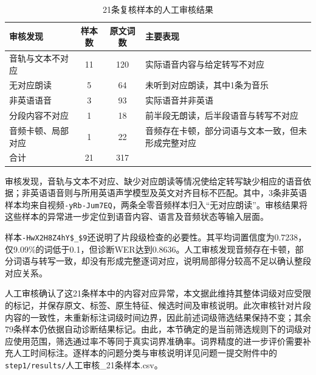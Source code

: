 \begin{table}[H]
    \centering\small
    \caption{21条复核样本的人工审核结果}
    \label{tab:p1_manual_review}
    \setlength{\tabcolsep}{6pt}
    \renewcommand{\arraystretch}{1.12}
    \ifdefined\pOneCompactTableBox\else\newsavebox{\pOneCompactTableBox}\fi
    \begin{lrbox}{\pOneCompactTableBox}
    \begin{tabular}{lcc>{\raggedright\arraybackslash}p{18em}}
        \toprule
        审核发现 & 样本数 & 原文词数 & 主要表现\\
        \midrule
        音轨与文本不对应 & 11 & 120 & 实际语音内容与给定转写不对应\\
        无对应朗读 & 5 & 64 & 未听到对应朗读，其中1条为音乐\\
        非英语语音 & 3 & 93 & 实际语音并非英语\\
        分段内容不对应 & 1 & 18 & 前半段无朗读，后半段语音与转写不对应\\
        音频卡顿、局部对应 & 1 & 22 & 音频存在卡顿，部分词语与文本一致，但未形成完整对应\\
        \midrule
        合计 & 21 & 317 & \\
        \bottomrule
    \end{tabular}
    \end{lrbox}
    \usebox{\pOneCompactTableBox}
\end{table}

审核发现，音轨与文本不对应、缺少对应朗读等情况使给定转写缺少相应的语音依据；非英语语音则与所用英语声学模型及英文对齐目标不匹配。其中，3条非英语样本均来自视频\nolinkurl{-yRb-Jum7EQ}，两条全零音频样本归入“无对应朗读”。审核结果将这些样本的异常进一步定位到语音内容、语言及音频状态等输入层面。

样本\nolinkurl{-HwX2H8Z4hY$_$9}还说明了片段级检查的必要性。其平均词置信度为0.7238，仅9.09\%的词低于0.1，但诊断WER达到0.8636。人工审核发现音频存在卡顿，部分词语与转写一致，却没有形成完整逐词对应，说明局部得分较高不足以确认整段对应关系。

人工审核确认了这21条样本中的内容对应异常，本文据此维持其整体词级对应受限的标记，并保存原文、标签、原生特征、候选时间及审核说明。此次审核针对片段内容的一致性，未重新标注词级时间边界，因此前述词级筛选结果保持不变；其余79条样本仍依据自动诊断结果标记。由此，本节确定的是当前筛选规则下的词级对应使用范围，筛选通过率不等同于真实词界准确率。词界精度的进一步评价需要补充人工时间标注。逐样本的问题分类与审核说明详见问题一提交附件中的\nolinkurl{step1/results/}\textnormal{人工审核\_21条样本.csv}。

